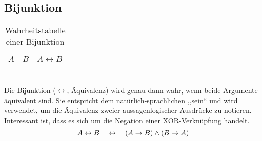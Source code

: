 \subsection{Bijunktion}
%
\begin{table}[ht]
 \begin{center}
  \begin{tabular}{cc|c}
   \hline
    $A$ & $B$ & $A \leftrightarrow{} B$ \\
   \hline \hline
    \F  & \F  & \T \\
    \F  & \T  & \F \\
    \T  & \F  & \F \\
    \T  & \T  & \T \\
  \end{tabular}
  \caption{Wahrheitstabelle einer Bijunktion}
  \label{fig:bijunction_operator}
 \end{center}
\end{table}
%
Die Bijunktion ($\leftrightarrow$, Äquivalenz) wird genau dann wahr, wenn beide Argumente äquivalent sind. Sie entspricht dem natürlich-sprachlichen ,,sein`` und wird verwendet, um die Äquivalenz zweier aussagenlogischer Ausdrücke zu notieren. Interessant ist, dass es sich um die Negation einer XOR-Verknüpfung handelt. %
%
\begin{equation}
  A \leftrightarrow B  \quad\leftrightarrow\quad (A \rightarrow B) \land (B \rightarrow A)
\end{equation}
%
